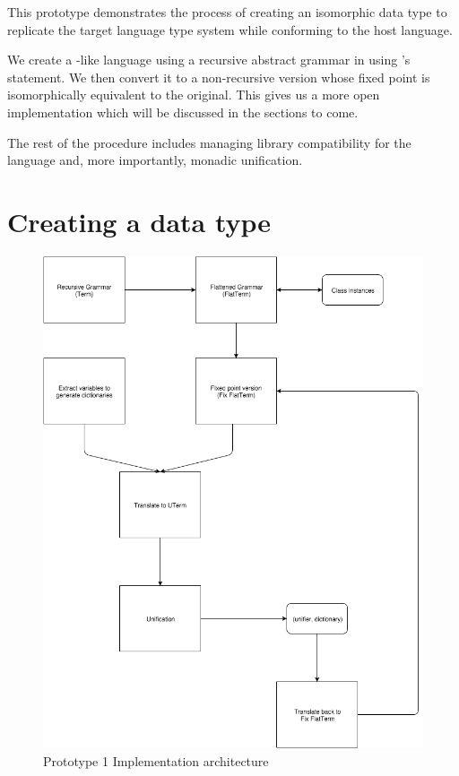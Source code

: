 \documentclass[thesis-solanki.tex]{subfiles}
\begin{document}
This prototype demonstrates the process of creating an isomorphic data type to replicate the target language type system while
conforming to the host language.

We create a -like language using a recursive abstract grammar in  using
's   statement.
We then convert it to a non-recursive version whose fixed point is isomorphically equivalent to the original.
This gives us a more open implementation which will be discussed in the sections to come.

The rest of the procedure includes managing library compatibility for the language and, more importantly, monadic
unification.

\section{Creating a data type}
\begin{figure}
  \includegraphics[width=1\textwidth]{prototype_1_implementation_architecture.png}
  \caption{Prototype 1 Implementation architecture}
  \label{fig:proto1-impl-arch}
\end{figure}
\end{document}
